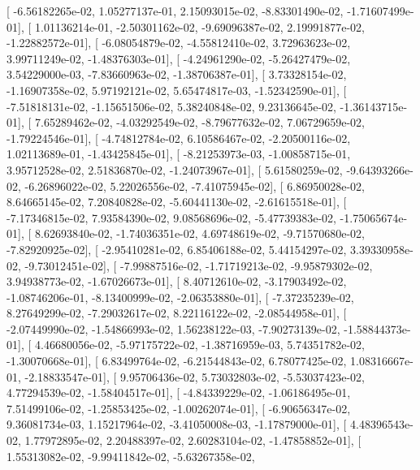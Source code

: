 \documentclass{article}
\begin{document}
       [ -6.56182265e-02,   1.05277137e-01,   2.15093015e-02,
         -8.83301490e-02,  -1.71607499e-01],
       [  1.01136214e-01,  -2.50301162e-02,  -9.69096387e-02,
          2.19991877e-02,  -1.22882572e-01],
       [ -6.08054879e-02,  -4.55812410e-02,   3.72963623e-02,
          3.99711249e-02,  -1.48376303e-01],
       [ -4.24961290e-02,  -5.26427479e-02,   3.54229000e-03,
         -7.83660963e-02,  -1.38706387e-01],
       [  3.73328154e-02,  -1.16907358e-02,   5.97192121e-02,
          5.65474817e-03,  -1.52342590e-01],
       [ -7.51818131e-02,  -1.15651506e-02,   5.38240848e-02,
          9.23136645e-02,  -1.36143715e-01],
       [  7.65289462e-02,  -4.03292549e-02,  -8.79677632e-02,
          7.06729659e-02,  -1.79224546e-01],
       [ -4.74812784e-02,   6.10586467e-02,  -2.20500116e-02,
          1.02113689e-01,  -1.43425845e-01],
       [ -8.21253973e-03,  -1.00858715e-01,   3.95712528e-02,
          2.51836870e-02,  -1.24073967e-01],
       [  5.61580259e-02,  -9.64393266e-02,  -6.26896022e-02,
          5.22026556e-02,  -7.41075945e-02],
       [  6.86950028e-02,   8.64665145e-02,   7.20840828e-02,
         -5.60441130e-02,  -2.61615518e-01],
       [ -7.17346815e-02,   7.93584390e-02,   9.08568696e-02,
         -5.47739383e-02,  -1.75065674e-01],
       [  8.62693840e-02,  -1.74036351e-02,   4.69748619e-02,
         -9.71570680e-02,  -7.82920925e-02],
       [ -2.95410281e-02,   6.85406188e-02,   5.44154297e-02,
          3.39330958e-02,  -9.73012451e-02],
       [ -7.99887516e-02,  -1.71719213e-02,  -9.95879302e-02,
          3.94938773e-02,  -1.67026673e-01],
       [  8.40712610e-02,  -3.17903492e-02,  -1.08746206e-01,
         -8.13400999e-02,  -2.06353880e-01],
       [ -7.37235239e-02,   8.27649299e-02,  -7.29032617e-02,
          8.22116122e-02,  -2.08544958e-01],
       [ -2.07449990e-02,  -1.54866993e-02,   1.56238122e-03,
         -7.90273139e-02,  -1.58844373e-01],
       [  4.46680056e-02,  -5.97175722e-02,  -1.38716959e-03,
          5.74351782e-02,  -1.30070668e-01],
       [  6.83499764e-02,  -6.21544843e-02,   6.78077425e-02,
          1.08316667e-01,  -2.18833547e-01],
       [  9.95706436e-02,   5.73032803e-02,  -5.53037423e-02,
          4.77294539e-02,  -1.58404517e-01],
       [ -4.84339229e-02,  -1.06186495e-01,   7.51499106e-02,
         -1.25853425e-02,  -1.00262074e-01],
       [ -6.90656347e-02,   9.36081734e-03,   1.15217964e-02,
         -3.41050008e-03,  -1.17879000e-01],
       [  4.48396543e-02,   1.77972895e-02,   2.20488397e-02,
          2.60283104e-02,  -1.47858852e-01],
       [  1.55313082e-02,  -9.99411842e-02,  -5.63267358e-02,
\end{document}
